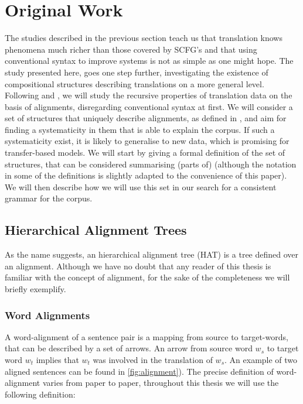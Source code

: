 \documentclass{report}
\theoremstyle{definition}
\theoremstyle{plain}
\begin{document}
\section{Original Work}

The studies described in the previous section teach us that translation knows phenomena much richer than those covered by SCFG's and that using conventional syntax to improve systems is not as simple as one might hope. The study presented here, goes one step further, investigating the existence of compositional structures describing translations on a more general level. Following \cite{wu1997stochastic} and \cite{wellington2006empirical}, we will study the recursive properties of translation data on the basis of alignments, disregarding conventional syntax at first.  We will consider a set of structures that uniquely describe alignments, as defined in \cite{simaan2013hats}, and aim for finding a systematicity in them that is able to explain the corpus. If such a systematicity exist, it is likely to generalise to new data, which is promising for transfer-based models. We will start by giving a formal definition of the set of structures, that can be considered summarising (parts of) \cite{simaan2013hats} (although the notation in some of the definitions is slightly adapted to the convenience of this paper). We will then describe how we will use this set in our search for a consistent grammar for the corpus.


\subsection{Hierarchical Alignment Trees}

As the name suggests, an hierarchical alignment tree (HAT) is a tree defined over an alignment. Although we have no doubt that any reader of this thesis is familiar with the concept of alignment, for the sake of the completeness we will briefly exemplify.

\subsubsection{Word Alignments} A word-alignment of a sentence pair is a mapping from source to target-words, that can be described by a set of arrows. An arrow from source word $w_s$ to target word $w_t$ implies that $w_t$ was involved in the translation of $w_s$. An example of two aligned sentences can be found in \ref{fig:alignment}). The precise definition of word-alignment varies from paper to paper, throughout this thesis we will use the following definition:
\end{document}
